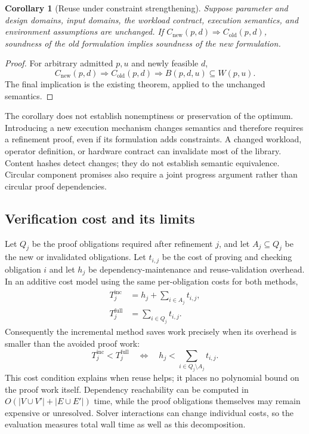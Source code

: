 \documentclass[11pt]{article}
\newtheorem{corollary}[theorem]{Corollary}
\begin{document}
\begin{corollary}[Reuse under constraint strengthening]\label{cor:strengthening}
Suppose parameter and design domains, input domains, the workload contract, execution semantics, and environment assumptions are unchanged. If $C_{\mathrm{new}}(p,d)\Rightarrow C_{\mathrm{old}}(p,d)$, soundness of the old formulation implies soundness of the new formulation.
\end{corollary}
\begin{proof}
For arbitrary admitted $p,u$ and newly feasible $d$,
\begin{equation}
 C_{\mathrm{new}}(p,d)\Longrightarrow C_{\mathrm{old}}(p,d)
 \Longrightarrow B(p,d,u)\subseteq W(p,u).
\end{equation}
The final implication is the existing theorem, applied to the unchanged semantics.
\end{proof}
The corollary does not establish nonemptiness or preservation of the optimum. Introducing a new execution mechanism changes semantics and therefore requires a refinement proof, even if its formulation adds constraints. A changed workload, operator definition, or hardware contract can invalidate most of the library. Content hashes detect changes; they do not establish semantic equivalence. Circular component promises also require a joint progress argument rather than circular proof dependencies.

\subsection{Verification cost and its limits}
Let $Q_j$ be the proof obligations required after refinement $j$, and let $A_j\subseteq Q_j$ be the new or invalidated obligations. Let $t_{i,j}$ be the cost of proving and checking obligation $i$ and let $h_j$ be dependency-maintenance and reuse-validation overhead. In an additive cost model using the same per-obligation costs for both methods,
\begin{align}
 T^{\mathrm{inc}}_j&=h_j+\sum_{i\in A_j}t_{i,j},\\
 T^{\mathrm{full}}_j&=\sum_{i\in Q_j}t_{i,j}.
\end{align}
Consequently the incremental method saves work precisely when its overhead is smaller than the avoided proof work:
\begin{equation}
 T^{\mathrm{inc}}_j<T^{\mathrm{full}}_j
 \quad\Longleftrightarrow\quad
 h_j<\sum_{i\in Q_j\setminus A_j}t_{i,j}.
 \label{eq:reuse-benefit}
\end{equation}
This cost condition explains when reuse helps; it places no polynomial bound on the proof work itself. Dependency reachability can be computed in $O(|V\cup V'|+|E\cup E'|)$ time, while the proof obligations themselves may remain expensive or unresolved. Solver interactions can change individual costs, so the evaluation measures total wall time as well as this decomposition.
\end{document}
